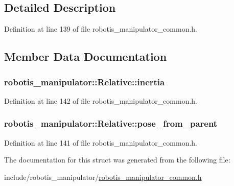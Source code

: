 \subsection{Detailed Description}


Definition at line 139 of file robotis\+\_\+manipulator\+\_\+common.\+h.



\subsection{Member Data Documentation}
\subsubsection[{\texorpdfstring{inertia}{inertia}}]{ robotis\+\_\+manipulator\+::\+Relative\+::inertia}\hypertarget{structrobotis__manipulator_1_1_relative_ad761bd6e74a48a22dedb93feed45f5db}{}\label{structrobotis__manipulator_1_1_relative_ad761bd6e74a48a22dedb93feed45f5db}


Definition at line 142 of file robotis\+\_\+manipulator\+\_\+common.\+h.

\subsubsection[{\texorpdfstring{pose\+\_\+from\+\_\+parent}{pose_from_parent}}]{ robotis\+\_\+manipulator\+::\+Relative\+::pose\+\_\+from\+\_\+parent}\hypertarget{structrobotis__manipulator_1_1_relative_a0a5f840d8a1f1f34ebd5e285209a8660}{}\label{structrobotis__manipulator_1_1_relative_a0a5f840d8a1f1f34ebd5e285209a8660}


Definition at line 141 of file robotis\+\_\+manipulator\+\_\+common.\+h.



The documentation for this struct was generated from the following file\+:\begin{DoxyCompactItemize}
\item 
include/robotis\+\_\+manipulator/\hyperlink{robotis__manipulator__common_8h}{robotis\+\_\+manipulator\+\_\+common.\+h}\end{DoxyCompactItemize}
